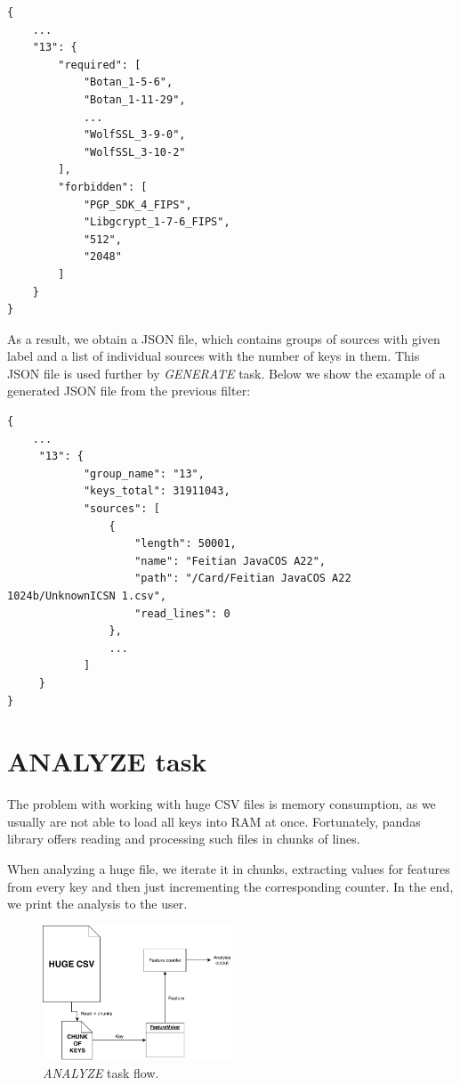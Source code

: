 \begin{verbatim}
{
    ...
    "13": {
        "required": [
            "Botan_1-5-6",
            "Botan_1-11-29",
            ...
            "WolfSSL_3-9-0",
            "WolfSSL_3-10-2"
        ],
        "forbidden": [
            "PGP_SDK_4_FIPS",
            "Libgcrypt_1-7-6_FIPS",
            "512",
            "2048"
        ]
    }
}

\end{verbatim}

\noindent
As a result, we obtain a JSON file, which contains groups of sources with given label and a list of individual sources with the number of keys in them. This JSON file is used further by \textit{GENERATE} task. Below we show the example of a generated JSON file from the previous filter:

\begin{verbatim}
{
    ...
     "13": {
            "group_name": "13",
            "keys_total": 31911043,
            "sources": [
                {
                    "length": 50001,
                    "name": "Feitian JavaCOS A22",
                    "path": "/Card/Feitian JavaCOS A22 1024b/UnknownICSN 1.csv",
                    "read_lines": 0
                },
                ...
            ]
     }
}

\end{verbatim}

\section{ANALYZE task}

The problem with working with huge CSV files is memory consumption, as we usually are not able to load all keys into RAM at once. Fortunately, pandas\cite{pandas} library offers reading and processing such files in chunks of lines. 

When analyzing a huge file, we iterate it in chunks, extracting values for features from every key and then just incrementing the corresponding counter. In the end, we print the analysis to the user.

\begin{figure}[h]

\centering
\includegraphics[width=0.5\textwidth]{tex/images/analyze_task}
\caption{\textit{ANALYZE} task flow.}

\end{figure}


